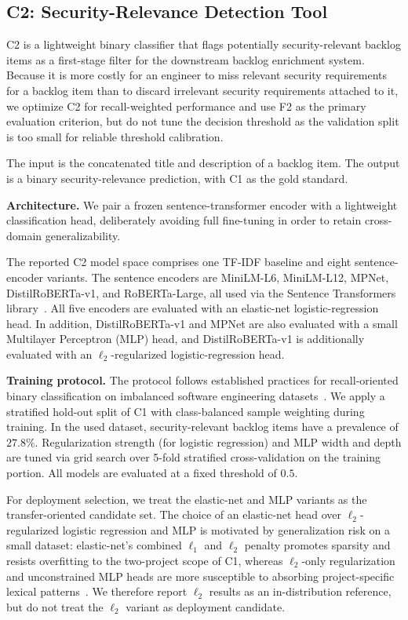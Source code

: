 \subsection*{C2: Security-Relevance Detection Tool}\label{sec:methodology-c2}

C2 is a lightweight binary classifier that flags potentially security-relevant backlog items as a first-stage filter for the downstream backlog enrichment system.
Because it is more costly for an engineer to miss relevant security requirements for a backlog item than to discard irrelevant security requirements attached to it, we optimize C2 for recall-weighted performance and use F2 as the primary evaluation criterion, but do not tune the decision threshold as the validation split is too small for reliable threshold calibration.

The input is the concatenated title and description of a backlog item.
The output is a binary security-relevance prediction, with C1 as the gold standard.

\textbf{Architecture.}
We pair a frozen sentence-transformer encoder with a lightweight classification head, deliberately avoiding full fine-tuning in order to retain cross-domain generalizability.

The reported C2 model space comprises one TF-IDF baseline and eight sentence-encoder variants.
The sentence encoders are MiniLM-L6, MiniLM-L12, MPNet, DistilRoBERTa-v1, and RoBERTa-Large, all used via the Sentence Transformers library~\cite{reimers2019sbert}.
All five encoders are evaluated with an elastic-net logistic-regression head.
In addition, DistilRoBERTa-v1 and MPNet are also evaluated with a small Multilayer Perceptron (MLP) head, and DistilRoBERTa-v1 is additionally evaluated with an $\ell_2$-regularized logistic-regression head.

\textbf{Training protocol.}
The protocol follows established practices for recall-oriented binary classification on imbalanced software engineering datasets~\cite{tantithamthavorn2020rebalancing}.
We apply a stratified hold-out split of C1 with class-balanced sample weighting during training.
In the used dataset, security-relevant backlog items have a prevalence of $27.8\%$.
Regularization strength (for logistic regression) and MLP width and depth are tuned via grid search over 5-fold stratified cross-validation on the training portion.
All models are evaluated at a fixed threshold of $0.5$.

For deployment selection, we treat the elastic-net and MLP variants as the transfer-oriented candidate set.
The choice of an elastic-net head over $\ell_2$-regularized logistic regression and MLP is motivated by generalization risk on a small dataset: elastic-net's combined $\ell_1$ and $\ell_2$ penalty promotes sparsity and resists overfitting to the two-project scope of C1, whereas $\ell_2$-only regularization and unconstrained MLP heads are more susceptible to absorbing project-specific lexical patterns~\cite{zou2005elastic-net}.
We therefore report $\ell_2$ results as an in-distribution reference, but do not treat the $\ell_2$ variant as deployment candidate.


